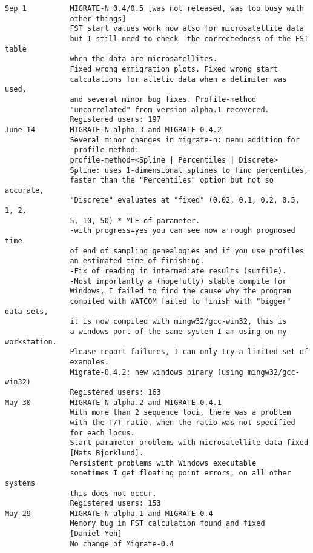 \begin{small}
\begin{verbatim}
Sep 1          MIGRATE-N 0.4/0.5 [was not released, was too busy with 
               other things]
               FST start values work now also for microsatellite data
               but I still need to check  the correctedness of the FST table
               when the data are microsatellites.
               Fixed wrong emmigration plots. Fixed wrong start 
               calculations for allelic data when a delimiter was used,
               and several minor bug fixes. Profile-method
               "uncorrelated" from version alpha.1 recovered.
               Registered users: 197
June 14        MIGRATE-N alpha.3 and MIGRATE-0.4.2
               Several minor changes in migrate-n: menu addition for
               -profile method: 
               profile-method=<Spline | Percentiles | Discrete>
               Spline: uses 1-dimensional splines to find percentiles,
               faster than the "Percentiles" option but not so accurate,
               "Discrete" evaluates at "fixed" (0.02, 0.1, 0.2, 0.5, 1, 2,
               5, 10, 50) * MLE of parameter.
               -with progress=yes you can see now a rough prognosed time 
               of end of sampling genealogies and if you use profiles 
               an estimated time of finishing.
               -Fix of reading in intermediate results (sumfile).
               -Most importantly a (hopefully) stable compile for 
               Windows, I failed to find the cause why the program
               compiled with WATCOM failed to finish with "bigger" data sets,
               it is now compiled with mingw32/gcc-win32, this is
               a windows port of the same system I am using on my workstation.
               Please report failures, I can only try a limited set of 
               examples.
               Migrate-0.4.2: new windows binary (using mingw32/gcc-win32)
               Registered users: 163
May 30         MIGRATE-N alpha.2 and MIGRATE-0.4.1
               With more than 2 sequence loci, there was a problem
               with the T/T-ratio, when the ratio was not specified 
               for each locus.
               Start parameter problems with microsatellite data fixed
               [Mats Bjorklund]. 
               Persistent problems with Windows executable
               sometimes I get floating point errors, on all other systems
               this does not occur.
               Registered users: 153
May 29         MIGRATE-N alpha.1 and MIGRATE-0.4
               Memory bug in FST calculation found and fixed
               [Daniel Yeh] 
               No change of Migrate-0.4

\end{verbatim}
\end{small}

